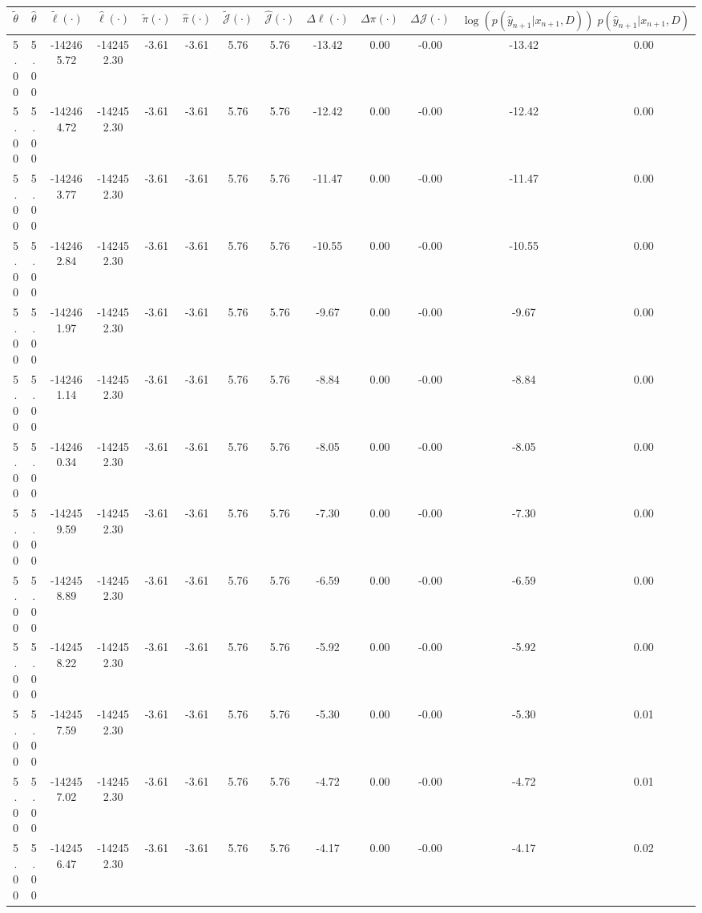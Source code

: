 \begin{table}[htbp]
        \centering
        \tiny
        \begin{adjustbox}{angle=90}
            \begin{tabular}{|c|c|c|c|c|c|c|c|c|c|c|c|c|}
                \hline
                 $\tilde{\theta}$ & $\hat{\theta}$ & $\tilde{\ell}(\cdot)$ & $\hat{\ell}(\cdot)$ & $\tilde{\pi}(\cdot)$ & $\hat{\pi}(\cdot)$ & $\tilde{\mathcal{J}}(\cdot)$ & $\hat{\mathcal{J}}(\cdot)$ & $\Delta \ell(\cdot)$ & $\Delta \pi(\cdot)$ & $\Delta \mathcal{J}(\cdot)$ & $\log(p(\hat{y}_{n+1}|x_{n+1}, D))$ & $p(\hat{y}_{n+1}|x_{n+1}, D)$ \\
                \hline
                 5.00 & 5.00 & -142465.72 & -142452.30 & -3.61 & -3.61 & 5.76 & 5.76 & -13.42 & 0.00 & -0.00 & -13.42 & 0.00\\ \hline
 5.00 & 5.00 & -142464.72 & -142452.30 & -3.61 & -3.61 & 5.76 & 5.76 & -12.42 & 0.00 & -0.00 & -12.42 & 0.00\\ \hline
 5.00 & 5.00 & -142463.77 & -142452.30 & -3.61 & -3.61 & 5.76 & 5.76 & -11.47 & 0.00 & -0.00 & -11.47 & 0.00\\ \hline
 5.00 & 5.00 & -142462.84 & -142452.30 & -3.61 & -3.61 & 5.76 & 5.76 & -10.55 & 0.00 & -0.00 & -10.55 & 0.00\\ \hline
 5.00 & 5.00 & -142461.97 & -142452.30 & -3.61 & -3.61 & 5.76 & 5.76 & -9.67 & 0.00 & -0.00 & -9.67 & 0.00\\ \hline
 5.00 & 5.00 & -142461.14 & -142452.30 & -3.61 & -3.61 & 5.76 & 5.76 & -8.84 & 0.00 & -0.00 & -8.84 & 0.00\\ \hline
 5.00 & 5.00 & -142460.34 & -142452.30 & -3.61 & -3.61 & 5.76 & 5.76 & -8.05 & 0.00 & -0.00 & -8.05 & 0.00\\ \hline
 5.00 & 5.00 & -142459.59 & -142452.30 & -3.61 & -3.61 & 5.76 & 5.76 & -7.30 & 0.00 & -0.00 & -7.30 & 0.00\\ \hline
 5.00 & 5.00 & -142458.89 & -142452.30 & -3.61 & -3.61 & 5.76 & 5.76 & -6.59 & 0.00 & -0.00 & -6.59 & 0.00\\ \hline
 5.00 & 5.00 & -142458.22 & -142452.30 & -3.61 & -3.61 & 5.76 & 5.76 & -5.92 & 0.00 & -0.00 & -5.92 & 0.00\\ \hline
 5.00 & 5.00 & -142457.59 & -142452.30 & -3.61 & -3.61 & 5.76 & 5.76 & -5.30 & 0.00 & -0.00 & -5.30 & 0.01\\ \hline
 5.00 & 5.00 & -142457.02 & -142452.30 & -3.61 & -3.61 & 5.76 & 5.76 & -4.72 & 0.00 & -0.00 & -4.72 & 0.01\\ \hline
 5.00 & 5.00 & -142456.47 & -142452.30 & -3.61 & -3.61 & 5.76 & 5.76 & -4.17 & 0.00 & -0.00 & -4.17 & 0.02\\ \hline

\end{tabular}
\end{adjustbox}
\end{table}
